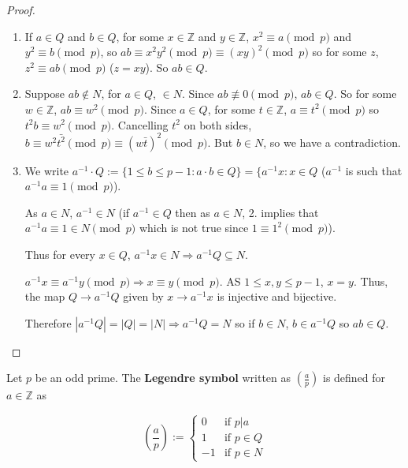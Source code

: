 \begin{proof}
	\hfill
	\begin{enumerate}
		\item If $a \in Q$ and $b \in Q$, for some $x \in \mathbb{Z}$ and $y \in \mathbb{Z}$, $x^2 \equiv a \pmod{p}$ and $y^2 \equiv b \pmod{p}$, so $ab \equiv x^2 y^2 \pmod{p} \equiv (xy)^2 \pmod{p}$ so for some $z$, $z^2 \equiv ab \pmod{p}$ ($z = xy$). So $ab \in Q$.
		\item Suppose $ab \notin N$, for $a \in Q$, $ \in N$. Since $ab \not\equiv 0 \pmod{p}$, $ab \in Q$. So for some $w \in \mathbb{Z}$, $ab \equiv w^2 \pmod{p}$. Since $a \in Q$, for some $t \in \mathbb{Z}$, $a \equiv t^2 \pmod{p}$ so $t^2 b \equiv w^2 \pmod{p}$. Cancelling $t^2$ on both sides, $b \equiv w^2 \bar{t^2} \pmod{p} \equiv (w \bar{t})^2 \pmod{p}$. But $b \in N$, so we have a contradiction.
		\item We write $a^{-1} \cdot Q := \{1 \le b \le p - 1: a \cdot b \in Q\} = \{a^{-1}x: x \in Q$ ($a^{-1}$ is such that $a^{-1}a \equiv 1 \pmod{p}$).
		
		As $a \in N$, $a^{-1} \in N$ (if $a^{-1} \in Q$ then as $a \in N$, 2. implies that $a^{-1}a \equiv 1 \in N \pmod{p}$ which is not true since $1 \equiv 1^2 \pmod{p}$).

		Thus for every $x \in Q$, $a^{-1}x \in N \Rightarrow a^{-1}Q \subseteq N$.
		
		$a^{-1}x \equiv a^{-1}y \pmod{p} \Rightarrow x \equiv y \pmod{p}$. AS $1 \le x, y \le p - 1$, $x = y$. Thus, the map $Q \rightarrow a^{-1}Q$ given by $x \rightarrow a^{-1}x$ is injective and bijective.

		Therefore $|a^{-1}Q| = |Q| = |N| \Rightarrow a^{-1}Q = N$ so if $b \in N$, $b \in a^{-1}Q$ so $ab \in Q$.
	\end{enumerate}
\end{proof}

\begin{definition}
	Let $p$ be an odd prime. The \textbf{Legendre symbol} written as $(\frac{a}{p})$ is defined for $a \in \mathbb{Z}$ as

	\begin{equation}
		(\frac{a}{p}) :=
		\begin{cases}
			0 & \text{if } p | a\\
			1 & \text{if } p \in Q\\
			-1 & \text{if } p \in N
		\end{cases}
	\end{equation}
\end{definition}


